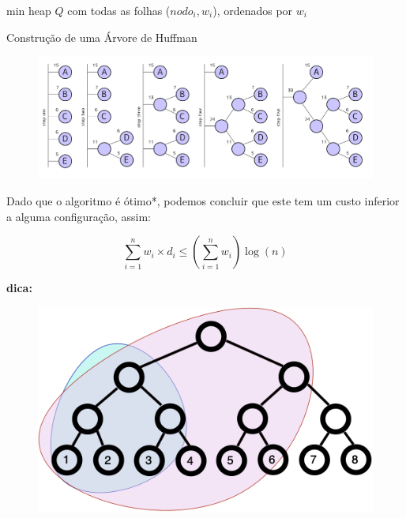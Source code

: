 \documentclass[12pt]{beamer}
\begin{document}
\begin{frame}
\hspace*{0.5cm} %
\begin{minipage}{0.93\textwidth}
\SetAlFnt{\footnotesize} %
\begin{algorithm}[H]
  min heap $Q$ com todas as folhas ($nodo_i, w_i$), ordenados por $w_i$\;
  \caption{Construção de uma Árvore de Huffman}
\end{algorithm}
\end{minipage}
\end{frame}

\begin{frame}
\begin{exemplo}
\begin{figure}
    \centering
    \includegraphics[width=1\linewidth]{img/huffmanalgorithm.png}
    \label{fig:enter-label}
\end{figure}  
\end{exemplo}    
\end{frame}

\begin{frame}
\begin{bloco}
Dado que o algoritmo é ótimo*, podemos concluir que este tem um custo inferior a alguma configuração, assim:

\[
\sum_{i=1}^n w_i \times d_i \le \left(\sum_{i=1}^n w_i\right) \log (n)
\]

\pause

\textbf{dica:}

\begin{figure}
    \centering
    \includegraphics[width=0.4\linewidth, height=0.23\textwidth]{img/complete.png}
    \label{fig:enter-label}
\end{figure}

\end{bloco}
\end{frame}
\end{document}
